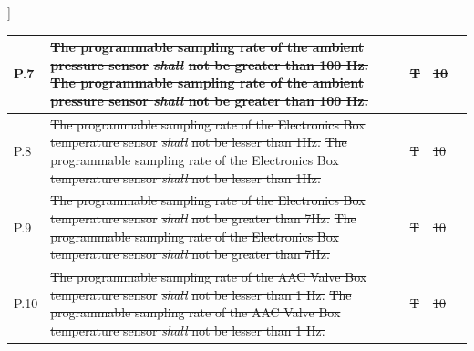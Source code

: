 ]\documentclass[a4paper,12pt,twoside]{article}
\providecommand{\DIFaddtex}[1]{{\protect\color{blue}\uwave{#1}}} %
\providecommand{\DIFdeltex}[1]{{\protect\color{red}\sout{#1}}}                      %
\providecommand{\DIFaddbegin}{} %
\providecommand{\DIFaddend}{} %
\providecommand{\DIFdelbegin}{} %
\providecommand{\DIFdelend}{} %
\providecommand{\DIFadd}[1]{\texorpdfstring{\DIFaddtex{#1}}{#1}} %
\providecommand{\DIFdel}[1]{\texorpdfstring{\DIFdeltex{#1}}{}} %
\newcommand{\DIFscaledelfig}{0.5}
\newlength{\DIFdelgraphicswidth} %
\newlength{\DIFdelgraphicsheight} %
\newcommand{\DIFaddincludegraphics}[2][]{{\color{blue}\fbox{\DIFOincludegraphics[#1]{#2}}}} %
\newcommand{\DIFdelincludegraphics}[2][]{%
\sbox{\DIFdelgraphicsbox}{\DIFOincludegraphics[#1]{#2}}%
\settoboxwidth{\DIFdelgraphicswidth}{\DIFdelgraphicsbox} %
\settoboxtotalheight{\DIFdelgraphicsheight}{\DIFdelgraphicsbox} %
\scalebox{\DIFscaledelfig}{%
\parbox[b]{\DIFdelgraphicswidth}{\usebox{\DIFdelgraphicsbox}\\[-\baselineskip] \rule{\DIFdelgraphicswidth}{0em}}\llap{\resizebox{\DIFdelgraphicswidth}{\DIFdelgraphicsheight}{%
\setlength{\unitlength}{\DIFdelgraphicswidth}%
\begin{picture}(1,1)%
\thicklines\linethickness{2pt} %
{\color[rgb]{1,0,0}\put(0,0){\framebox(1,1){}}}%
{\color[rgb]{1,0,0}\put(0,0){\line( 1,1){1}}}%
{\color[rgb]{1,0,0}\put(0,1){\line(1,-1){1}}}%
\end{picture}%
}\hspace*{3pt}}} %
} %
\DeclareRobustCommand{\DIFaddbegin}{\DIFOaddbegin \let\includegraphics\DIFaddincludegraphics} %
\DeclareRobustCommand{\DIFaddend}{\DIFOaddend \let\includegraphics\DIFOincludegraphics} %
\DeclareRobustCommand{\DIFdelbegin}{\DIFOdelbegin \let\includegraphics\DIFdelincludegraphics} %
\DeclareRobustCommand{\DIFdelend}{\DIFOaddend \let\includegraphics\DIFOincludegraphics} %
\begin{document}
\begin{longtable}[]{|m{}| m{} |m{} |m{}|m{}|}
P.7  & \DIFdelbegin \DIFdel{The programmable sampling rate of the ambient pressure sensor }\textit{\DIFdel{shall}} %
\DIFdel{not be greater than 100 Hz.                                                                         }\DIFdelend \DIFaddbegin \st{The programmable sampling rate of the ambient pressure sensor \textit{shall} not be greater than 100 Hz.}\DIFadd{\textsuperscript{\ref{replaceSoftVeri}}                                                                         }\DIFaddend &       \DIFdelbegin \DIFdel{T       }\DIFdelend \DIFaddbegin \DIFadd{-     }\DIFaddend & \DIFdelbegin \DIFdel{10            }\DIFdelend \DIFaddbegin \DIFadd{-           }\DIFaddend &        \\ \hline
P.8  & \DIFdelbegin \DIFdel{The programmable sampling rate of the Electronics Box temperature sensor }\textit{\DIFdel{shall}} %
\DIFdel{not be lesser than 1Hz.                                                                          }\DIFdelend \DIFaddbegin \st{The programmable sampling rate of the Electronics Box temperature sensor \textit{shall} not be lesser than 1Hz.}\DIFadd{\textsuperscript{\ref{replaceSoftVeri}}                                                                          }\DIFaddend &       \DIFdelbegin \DIFdel{T       }\DIFdelend \DIFaddbegin \DIFadd{-       }\DIFaddend & \DIFdelbegin \DIFdel{10            }\DIFdelend \DIFaddbegin \DIFadd{-            }\DIFaddend &        \\ \hline
P.9  & \DIFdelbegin \DIFdel{The programmable sampling rate of the Electronics Box temperature sensor }\textit{\DIFdel{shall}} %
\DIFdel{not be greater than 7Hz.                                                                         }\DIFdelend \DIFaddbegin \st{The programmable sampling rate of the Electronics Box temperature sensor \textit{shall} not be greater than 7Hz. }\DIFadd{\textsuperscript{\ref{replaceSoftVeri}}                                                                        }\DIFaddend &        \DIFdelbegin \DIFdel{T      }\DIFdelend \DIFaddbegin \DIFadd{-    }\DIFaddend & \DIFdelbegin \DIFdel{10            }\DIFdelend \DIFaddbegin \DIFadd{-        }\DIFaddend &        \\ \hline
P.10 & \DIFdelbegin \DIFdel{The programmable sampling rate of the AAC Valve Box temperature sensor }\textit{\DIFdel{shall}} %
\DIFdel{not be lesser than 1 Hz.                                                                   }\DIFdelend \DIFaddbegin \st{The programmable sampling rate of the AAC Valve Box temperature sensor \textit{shall} not be lesser than 1 Hz. }\DIFadd{\textsuperscript{\ref{replaceSoftVeri}}                                                                  }\DIFaddend & \DIFdelbegin \DIFdel{T      }\DIFdelend \DIFaddbegin \DIFadd{-    }\DIFaddend & \DIFdelbegin \DIFdel{10            }\DIFdelend \DIFaddbegin \DIFadd{-        }\DIFaddend &        \\ \hline

\end{longtable}
\end{document}
